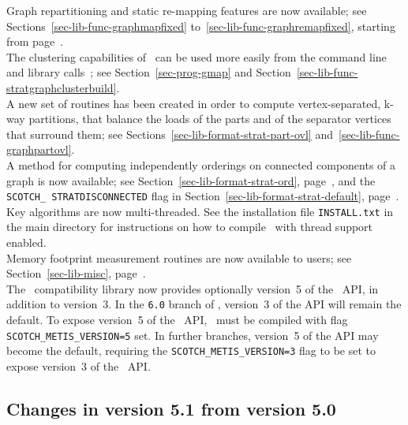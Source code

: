 Graph repartitioning and static re-mapping features are now available;
see Sections~\ref{sec-lib-func-graphmapfixed}
to~\ref{sec-lib-func-graphremapfixed}, starting from
page~\pageref{sec-lib-func-graphmapfixed}.
\\

The clustering capabilities of \scotch\ can be used more easily from
the command line and library calls~; see Section~\ref{sec-prog-gmap}
and Section~\ref{sec-lib-func-stratgraphclusterbuild}.
\\

A new set of routines has been created in order to compute
vertex-separated, k-way partitions, that balance the loads of the
parts and of the separator vertices that surround them; see
Sections~\ref{sec-lib-format-strat-part-ovl}
and~\ref{sec-lib-func-graphpartovl}.
\\

A method for computing independently orderings on connected components
of a graph is now available; see Section~\ref{sec-lib-format-strat-ord},
page~\pageref{sec-lib-format-strat-ord}, and the \texttt{SCOTCH\_\lbt
STRAT\lbt DISCON\lbt NECTED} flag in
Section~\ref{sec-lib-format-strat-default},
page~\pageref{sec-lib-format-strat-default}.
\\

Key algorithms are now multi-threaded. See the installation file
\texttt{INSTALL.txt} in the main directory for instructions on how to
compile \scotch\ with thread support enabled.
\\

Memory footprint measurement routines are now available to users;
see Section~\ref{sec-lib-misc}, page~\pageref{sec-lib-misc}.
\\

The \metis\ compatibility library now provides optionally version~5 of
the \metis\ API, in addition to version~3. In the \texttt{6.0} branch
of \scotch, version~3 of the API will remain the default. To expose
version~5 of the \metis\ API, \scotch\ must be compiled with flag
\texttt{SCOTCH\_\lbt METIS\_\lbt VERSION=5} set. In further branches,
version~5 of the API may become the default, requiring the
\texttt{SCOTCH\_\lbt METIS\_\lbt VERSION=3} flag to be set to expose
version~3 of the \metis\ API.

\subsection{Changes in version 5.1 from version 5.0}

